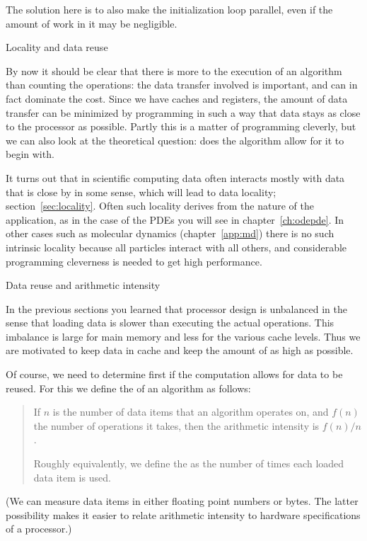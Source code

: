 The solution here is to also make the initialization loop parallel,
even if the amount of work in it may be negligible.

 {Locality and data reuse}

By now it should be clear that there is more to the execution of an
algorithm than counting the operations: the data transfer involved is
important, and can in fact dominate the cost. Since we have caches and
registers, the amount of data transfer can be minimized by programming
in such a way that data stays as close to the processor as
possible. Partly this is a matter of programming cleverly, but we can
also look at the theoretical question: does the algorithm allow for it
to begin with.

It turns out that in scientific computing data often
interacts mostly with data that is close by in some sense, which will
lead to data locality; section~\ref{sec:locality}. Often such locality
derives from the nature of the application, as in the case of the \acp{PDE} you
will see in chapter~\ref{ch:odepde}. In other cases such as molecular
dynamics (chapter~\ref{app:md}) there is no such intrinsic locality
because all particles interact with all others,
and considerable programming cleverness is needed to get high performance.

 {Data reuse and arithmetic intensity}
\label{sec:reuse}
\label{sec:intensity}

In the previous
  sections
you learned that processor design is unbalanced
in the sense that loading data is slower than executing the actual operations.
This imbalance is large for main memory and less for the various cache levels.
Thus we are motivated to keep data in cache and 
keep the amount of   as high as possible.

Of course, we need to determine first if the computation allows for data to be
reused.
For this we define the  
of an algorithm as follows:
\begin{quote}
  If $n$ is the number of data items that an algorithm operates on, and
  $f(n)$ the number of operations it takes, then the arithmetic intensity is
  $f(n)/n$.

  Roughly equivalently, we define the 
  as the number of times each loaded data item is used.
\end{quote}
(We can measure data items in either floating point numbers or bytes.
The latter possibility makes it easier to relate arithmetic intensity
to hardware specifications of a processor.)

